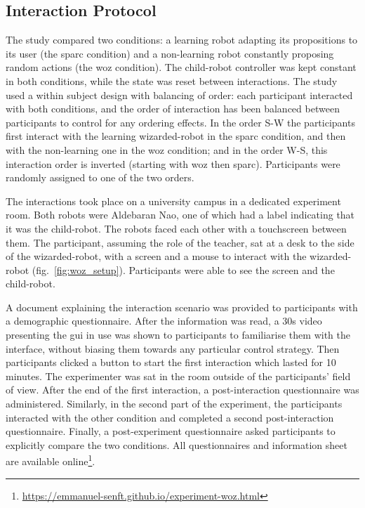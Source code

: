 \subsection{Interaction Protocol}

The study compared two conditions: a learning robot adapting its propositions to its user (the \gls{sparc} condition) and a non-learning robot constantly proposing random actions (the \gls{woz} condition). The child-robot controller was kept constant in both conditions, while the state was reset between interactions. The study used a within subject design with balancing of order: each participant interacted with both conditions, and the order of interaction has been balanced between participants to control for any ordering effects. In the order S-W the participants first interact with the learning wizarded-robot in the \gls{sparc} condition, and then with the non-learning one in the \gls{woz} condition; and in the order W-S, this interaction order is inverted (starting with \gls{woz} then \gls{sparc}). Participants were randomly assigned to one of the two orders.

The interactions took place on a university campus in a dedicated experiment room. Both robots were Aldebaran Nao, one of which had a label indicating that it was the child-robot. The robots faced each other with a touchscreen between them. The participant, assuming the role of the teacher, sat at a desk to the side of the wizarded-robot, with a screen and a mouse to interact with the wizarded-robot (fig.~\ref{fig:woz_setup}). Participants were able to see the screen and the child-robot.

A document explaining the interaction scenario was provided to participants with a demographic questionnaire. After the information was read, a 30s video presenting the \gls{gui} in use was shown to participants to familiarise them with the interface, without biasing them towards any particular control strategy. Then participants clicked a button to start the first interaction which lasted for 10 minutes. The experimenter was sat in the room outside of the participants' field of view. After the end of the first interaction, a post-interaction questionnaire was administered. Similarly, in the second part of the experiment, the participants interacted with the other condition and completed a second post-interaction questionnaire. Finally, a post-experiment questionnaire asked participants to explicitly compare the two conditions. All questionnaires and information sheet are available online\footnote{ \url{https://emmanuel-senft.github.io/experiment-woz.html}}.

